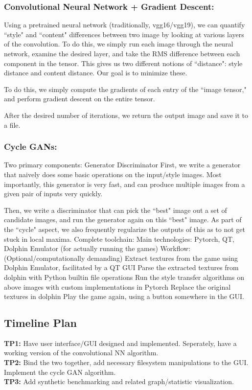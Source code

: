 \documentclass[12pt]{article}
\begin{document}
    \subsubsection{Convolutional Neural Network + Gradient Descent:}
    Using a pretrained neural network (traditionally, vgg16/vgg19), we can quantify ``style" and ``content" differences between two image by looking at various layers of the convolution. To do this, we simply run each image through the neural network, examine the desired layer, and take the RMS difference between each component in the tensor. 
    This gives us two different notions of ``distance": style distance and content distance. Our goal is to minimize these. 

    To do this, we simply compute the gradients of each entry of the ``image tensor," and perform gradient descent on the entire tensor. 

    After the desired number of iterations, we return the output image and save it to a file.

    \subsubsection{Cycle GANs:}
    Two primary components:
    Generator 
    Discriminator
    First, we write a generator that naively does some basic operations on the input/style images. Most importantly, this generator is very fast, and can produce multiple images from a given pair of inputs very quickly. 

    Then, we write a discriminator that can pick the ``best" image out a set of candidate images, and run the generator again on this ``best" image. As part of the ``cycle" aspect, we also frequently regularize the outputs of this as to not get stuck in local maxima. 
    Complete toolchain:
    Main technologies: Pytorch, QT, Dolphin Emulator (for actually running the games)
    Workflow: 
    (Optional/computationally demanding) Extract textures from the game using Dolphin Emulator, facilitated by a QT GUI
    Parse the extracted textures from dolphin with Python builtin file operations
    Run the style transfer algorithms on above images with custom implementations in Pytorch
    Replace the original textures in dolphin
    Play the game again, using a button somewhere in the GUI.

\subsection{Timeline Plan}
    \textbf{TP1:} Have user interface/GUI designed and implemented. Seperately, have a working version of the convolutional NN algorithm.\\
    \textbf{TP2:} Bind the two together, add necessary filesystem manipulations to the GUI. Implement the cycle GAN algorithm.\\
    \textbf{TP3:} Add synthetic benchmarking and related graph/statistic visualization.\\
\end{document}
